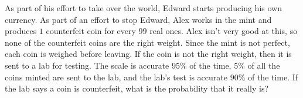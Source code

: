 As part of his effort to take over the world, Edward starts producing his own currency. As part of an effort to stop Edward, Alex works in the mint and produces $1$ counterfeit coin for every $99$ real ones. Alex isn't very good at this, so none of the counterfeit coins are the right weight. Since the mint is not perfect, each coin is weighed before leaving. If the coin is not the right weight, then it is sent to a lab for testing. The scale is accurate $95\%$ of the time, $5\%$ of all the coins minted are sent to the lab, and the lab's test is accurate $90\%$ of the time. If the lab says a coin is counterfeit, what is the probability that it really is?